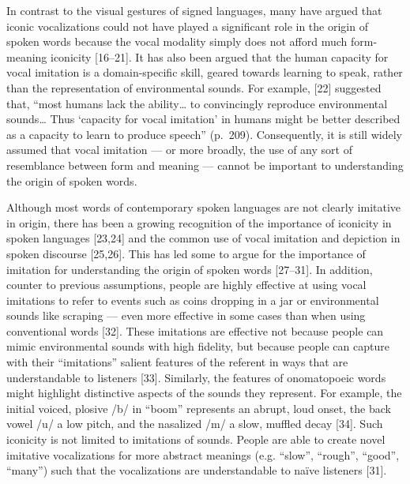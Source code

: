 \documentclass[english,floatsintext,man]{apa6}
\theoremstyle{definition}
\theoremstyle{definition}
\theoremstyle{definition}
\theoremstyle{remark}
\begin{document}
In contrast to the visual gestures of signed languages, many have argued
that iconic vocalizations could not have played a significant role in
the origin of spoken words because the vocal modality simply does not
afford much form-meaning iconicity {[}16--21{]}. It has also been argued
that the human capacity for vocal imitation is a domain-specific skill,
geared towards learning to speak, rather than the representation of
environmental sounds. For example, {[}22{]} suggested that,
\enquote{most humans lack the ability\ldots{} to convincingly reproduce
environmental sounds\ldots{} Thus \enquote{capacity for vocal imitation}
in humans might be better described as a capacity to learn to produce
speech} (p.~209). Consequently, it is still widely assumed that vocal
imitation --- or more broadly, the use of any sort of resemblance
between form and meaning --- cannot be important to understanding the
origin of spoken words.

Although most words of contemporary spoken languages are not clearly
imitative in origin, there has been a growing recognition of the
importance of iconicity in spoken languages {[}23,24{]} and the common
use of vocal imitation and depiction in spoken discourse {[}25,26{]}.
This has led some to argue for the importance of imitation for
understanding the origin of spoken words {[}27--31{]}. In addition,
counter to previous assumptions, people are highly effective at using
vocal imitations to refer to events such as coins dropping in a jar or
environmental sounds like scraping --- even more effective in some cases
than when using conventional words {[}32{]}. These imitations are
effective not because people can mimic environmental sounds with high
fidelity, but because people can capture with their \enquote{imitations}
salient features of the referent in ways that are understandable to
listeners {[}33{]}. Similarly, the features of onomatopoeic words might
highlight distinctive aspects of the sounds they represent. For example,
the initial voiced, plosive /b/ in \enquote{boom} represents an abrupt,
loud onset, the back vowel /u/ a low pitch, and the nasalized /m/ a
slow, muffled decay {[}34{]}. Such iconicity is not limited to
imitations of sounds. People are able to create novel imitative
vocalizations for more abstract meanings (e.g. \enquote{slow},
\enquote{rough}, \enquote{good}, \enquote{many}) such that the
vocalizations are understandable to naïve listeners {[}31{]}.
\end{document}
